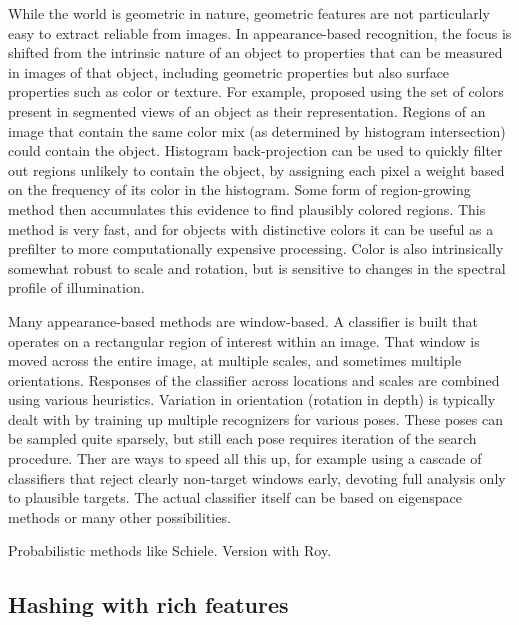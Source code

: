 While the world is geometric in nature, geometric features are  not
particularly easy to extract reliable from images.  In
appearance-based recognition, the focus is shifted from the 
intrinsic nature of an object to properties that can be measured
in images of that object, including geometric properties but
also surface properties such as color or texture.
%
For example, \cite{swain91color} proposed using the set of colors
present in segmented views of an object as their representation.
Regions of an image that contain the same color mix (as determined
by histogram intersection) could contain the object.
%
Histogram back-projection can be used to quickly filter out regions
unlikely to contain the object, by assigning each pixel a weight based
on the frequency of its color in the histogram.  Some form of
region-growing method then accumulates this evidence to find plausibly
colored regions.  This method is very fast, and for objects with
distinctive colors it can be useful as a prefilter to more
computationally expensive processing.
%
Color is also intrinsically somewhat robust to scale and rotation,
but is sensitive to changes in the spectral profile of illumination.

Many appearance-based methods are window-based.  A classifier is built
that operates on a rectangular region of interest within an image.
That window is moved across the entire image, at multiple scales, and
sometimes multiple orientations.  Responses of the classifier across
locations and scales are combined using various heuristics.  Variation
in orientation (rotation in depth) is typically dealt with by training
up multiple recognizers for various poses.  These poses can be sampled
quite sparsely, but still each pose requires iteration of the search
procedure.  Ther are ways to speed all this up, for example using a
cascade of classifiers that reject clearly non-target windows early,
devoting full analysis only to plausible targets.
%
The actual classifier itself can be based on eigenspace methods
or many other possibilities.

Probabilistic methods like Schiele.  Version with Roy.


\subsection{Hashing with rich features}

